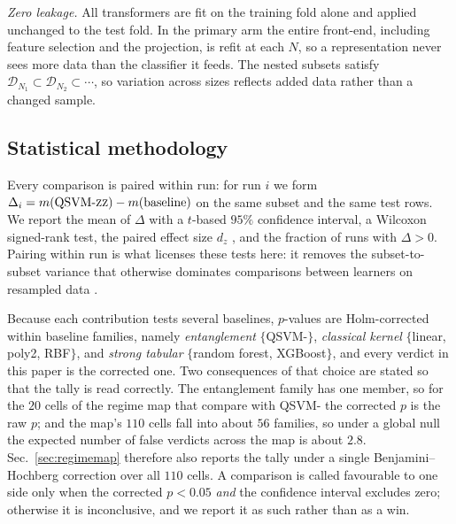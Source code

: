 \begin{revbody}
\emph{Zero leakage.} All transformers are fit on the training fold alone and
applied unchanged to the test fold. In the primary arm the entire front-end,
including feature selection and the projection, is refit at each $N$, so a
representation never sees more data than the classifier it feeds. The nested
subsets satisfy $\mathcal{D}_{N_1}\subset\mathcal{D}_{N_2}\subset\cdots$, so
variation across sizes reflects added data rather than a changed sample.
\end{revbody}

\subsection{Statistical methodology}
\label{sec:stats}
\begin{revbody}

Every comparison is paired within run: for run $i$ we form
$\Delta_i = m(\text{QSVM-\textsc{zz}{}}) - m(\text{baseline})$ on the same subset and the
same test rows. We report the mean of $\Delta$ with a $t$-based $95\%$
confidence interval, a Wilcoxon signed-rank test, the paired effect size $d_z$
\cite{ref32}, and the fraction of runs with $\Delta>0$. Pairing within run is
what licenses these tests here: it removes the subset-to-subset variance that
otherwise dominates comparisons between learners on resampled data \cite{ref31}.

Because each contribution tests several baselines, $p$-values are Holm-corrected
within baseline families, namely \emph{entanglement} $\{$QSVM-\Zmap{}$\}$,
\emph{classical kernel} $\{$linear, poly2, RBF$\}$, and \emph{strong tabular}
$\{$random forest, XGBoost$\}$, and every verdict in this paper is the
corrected one. Two consequences of that choice are stated so that the tally is
read correctly. The entanglement family has one member, so for the $20$ cells
of the regime map that compare \QSVM{} with QSVM-\Zmap{} the corrected $p$ is
the raw $p$; and the map's $110$ cells fall into about $56$ families, so under
a global null the expected number of false verdicts across the map is about
$2.8$. Sec.~\ref{sec:regimemap} therefore also reports the tally under a single
Benjamini--Hochberg correction over all $110$ cells. A comparison is called
favourable to one side only when the corrected $p<0.05$ \emph{and} the
confidence interval excludes zero; otherwise it is inconclusive, and we report
it as such rather than as a win.
\end{revbody}

